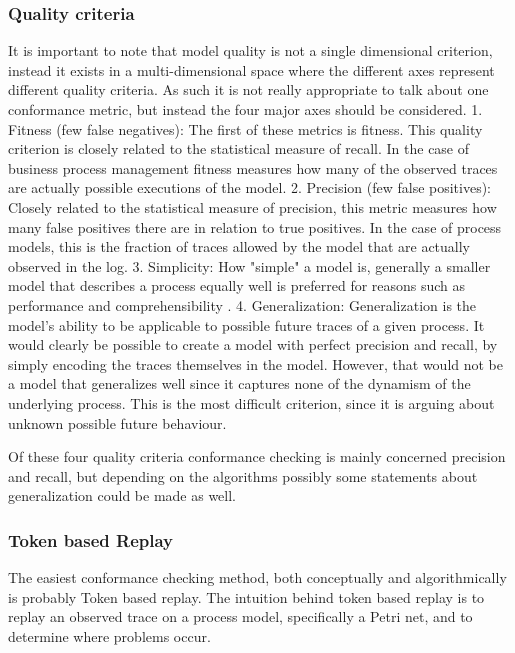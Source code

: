 \documentclass[runningheads]{template/llncs}
\begin{document}
\subsubsection{Quality criteria}
It is important to note that model quality is not a single dimensional criterion, instead it exists in a multi-dimensional space where the different axes represent different quality criteria.
As such it is not really appropriate to talk about one conformance metric, but instead the four major axes should be considered.
1. Fitness (few false negatives): The first of these metrics is fitness. This quality criterion is closely related to the statistical measure of recall. In the case of business process management fitness measures how many of the observed traces are actually possible executions of the model.
2. Precision (few false positives): Closely related to the statistical measure of precision, this metric measures how many false positives there are in relation to true positives. In the case of process models, this is the fraction of traces allowed by the model that are actually observed in the log.
3. Simplicity: How "simple" a model is, generally a smaller model that describes a process equally well is preferred for reasons such as performance and comprehensibility .
4. Generalization: Generalization is the model's ability to be applicable to possible future traces of a given process. 
It would clearly be possible to create a model with perfect precision and recall, by simply encoding the traces themselves in the model. However, that would not be a model that generalizes well since it captures none of the dynamism of the underlying process. 
This is the most difficult criterion, since it is arguing about unknown possible future behaviour.

Of these four quality criteria conformance checking is mainly concerned precision and recall, but depending on the algorithms possibly some statements about generalization could be made as well. 

\subsubsection{Token based Replay}

The easiest conformance checking method, both conceptually and algorithmically is probably Token based replay.
The intuition behind token based replay is to replay an observed trace on a process model, specifically a Petri net, and to determine where problems occur.
\end{document}
